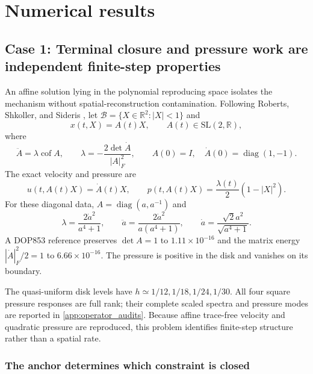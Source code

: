 \documentclass[11pt]{article}
\theoremstyle{plain}
\theoremstyle{definition}
\theoremstyle{remark}
\newcommand{\R}{\mathbb{R}}
\newcommand{\B}{\mathcal{B}}
\newcommand{\cof}{\operatorname{cof}}
\newcommand{\diag}{\operatorname{diag}}
\begin{document}
\section{Numerical results}
\label{sec:numerical_results}

\subsection{Case 1: Terminal closure and pressure work are independent finite-step properties}
\label{sec:result1}

An affine solution lying in the polynomial reproducing space isolates the
mechanism without spatial-reconstruction contamination.  Following Roberts,
Shkoller, and Sideris
\cite{RobertsShkollerSideris2020}, let
$\B=\{X\in\R^2:|X|<1\}$ and
\begin{equation}
  x(t,X)=A(t)X,
  \qquad A(t)\in\mathrm{SL}(2,\R),
  \label{eq:affine_exact_map}
\end{equation}
where
\begin{equation}
 \ddot A=\lambda\cof A,
 \qquad
 \lambda=-\frac{2\det\dot A}{|A|_F^2},
 \qquad
 A(0)=I,\quad \dot A(0)=\diag(1,-1).
 \label{eq:affine_matrix_equation}
\end{equation}
The exact velocity and pressure are
\begin{equation}
 u(t,A(t)X)=\dot A(t)X,
 \qquad
 p(t,A(t)X)=\frac{\lambda(t)}2(1-|X|^2).
 \label{eq:affine_velocity_pressure}
\end{equation}
For these diagonal data, $A=\diag(a,a^{-1})$ and
\begin{equation}
 \lambda=\frac{2\dot a^2}{a^4+1},
 \qquad
 \ddot a=\frac{2\dot a^2}{a(a^4+1)},
 \qquad
 \dot a=\frac{\sqrt2a^2}{\sqrt{a^4+1}}.
 \label{eq:affine_scalar_reference}
\end{equation}
A DOP853 reference preserves $\det A=1$ to $1.11\times10^{-16}$ and the
matrix energy $|\dot A|_F^2/2=1$ to $6.66\times10^{-16}$.  The pressure is
positive in the disk and vanishes on its boundary.

The quasi-uniform disk levels have $h\simeq1/12,1/18,1/24,1/30$.  All four
square pressure responses are full rank; their complete scaled spectra and
pressure modes are reported in \cref{app:operator_audits}.  Because affine
trace-free velocity and quadratic pressure are reproduced, this problem
identifies finite-step structure rather than a spatial rate.

\subsubsection{The anchor determines which constraint is closed}
\end{document}
